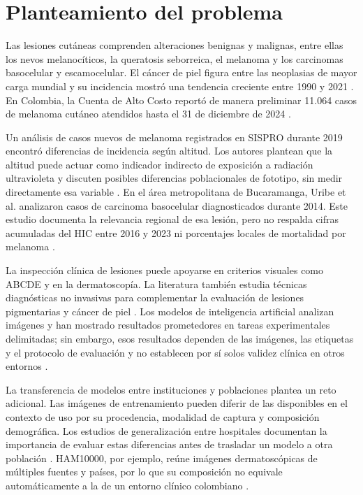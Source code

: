 \chapter{Planteamiento del problema}

Las lesiones cutáneas comprenden alteraciones benignas y malignas, entre ellas los nevos melanocíticos, la queratosis seborreica, el melanoma y los carcinomas basocelular y escamocelular. El cáncer de piel figura entre las neoplasias de mayor carga mundial y su incidencia mostró una tendencia creciente entre 1990 y 2021 \parencite{zhou2025skinburdengbd}. En Colombia, la Cuenta de Alto Costo reportó de manera preliminar 11.064 casos de melanoma cutáneo atendidos hasta el 31 de diciembre de 2024 \parencite{cuentaaltocosto2025melanoma}.

Un análisis de casos nuevos de melanoma registrados en SISPRO durante 2019 encontró diferencias de incidencia según altitud. Los autores plantean que la altitud puede actuar como indicador indirecto de exposición a radiación ultravioleta y discuten posibles diferencias poblacionales de fototipo, sin medir directamente esa variable \parencite{oliveros2025melanomacolombia}. En el área metropolitana de Bucaramanga, Uribe et al. analizaron casos de carcinoma basocelular diagnosticados durante 2014. Este estudio documenta la relevancia regional de esa lesión, pero no respalda cifras acumuladas del HIC entre 2016 y 2023 ni porcentajes locales de mortalidad por melanoma \parencite{uribe2018bccbucaramanga}.

La inspección clínica de lesiones puede apoyarse en criterios visuales como ABCDE y en la dermatoscopía. La literatura también estudia técnicas diagnósticas no invasivas para complementar la evaluación de lesiones pigmentarias y cáncer de piel \parencite{ligacancer2024abcde,pathania2022noninvasivediagnostics}. Los modelos de inteligencia artificial analizan imágenes y han mostrado resultados prometedores en tareas experimentales delimitadas; sin embargo, esos resultados dependen de las imágenes, las etiquetas y el protocolo de evaluación y no establecen por sí solos validez clínica en otros entornos \parencite{esteva2017dermatologist,chaturvedi2020multiclassskin}.

La transferencia de modelos entre instituciones y poblaciones plantea un reto adicional. Las imágenes de entrenamiento pueden diferir de las disponibles en el contexto de uso por su procedencia, modalidad de captura y composición demográfica. Los estudios de generalización entre hospitales documentan la importancia de evaluar estas diferencias antes de trasladar un modelo a otra población \parencite{yang2024crosshospital}. HAM10000, por ejemplo, reúne imágenes dermatoscópicas de múltiples fuentes y países, por lo que su composición no equivale automáticamente a la de un entorno clínico colombiano \parencite{tschandl2018ham10000}.

